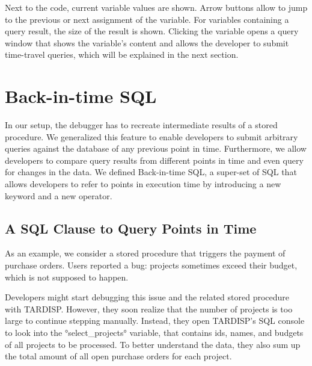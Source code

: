 \documentclass[english,conference]{IEEEtran}
\newcommand{\tool}{TAR\-DISP}
\newcommand{\SQLextension}{Back-in-time SQL}
\begin{document}
Next to the code, current variable values are shown.
Arrow buttons allow to jump to the previous or next assignment of the variable.
For variables containing a query result, the size of the result is shown.
Clicking the variable opens a query window that shows the variable's content and allows the developer to submit time-travel queries, which will be explained in the next section.


\section{\SQLextension}
\label{sec:ttqueries}

In our setup, the debugger has to recreate intermediate results of a stored procedure.
We generalized this feature to enable developers to submit arbitrary queries against the database of any previous point in time.
Furthermore, we allow developers to compare query results from different points in time and even query for changes in the data.
We defined \SQLextension, a super-set of SQL that allows developers to refer to points in execution time by introducing a new keyword and a new operator.

\subsection{A SQL Clause to Query Points in Time}

As an example, we consider a stored procedure that triggers the payment of purchase orders.
Users reported a bug: projects sometimes exceed their budget, which is not supposed to happen.

Developers might start debugging this issue and the related stored procedure with \tool.
However, they soon realize that the number of projects is too large to continue stepping manually.
Instead, they open \tool's SQL console to look into the °select_projects° variable, that contains ids, names, and budgets of all projects to be processed.
To better understand the data, they also sum up the total amount of all open purchase orders for each project.
\end{document}
